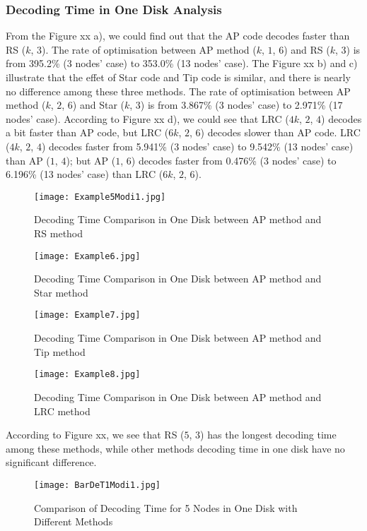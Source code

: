\subsubsection{Decoding Time in One Disk Analysis}
From the Figure xx a), we could find out that the AP code decodes faster than RS ($k$, $3$). The rate of optimisation between AP method ($k$, $1$, $6$) and RS ($k$, $3$) is from 395.2\% (3 nodes’ case) to 353.0\% (13 nodes’ case). The Figure xx b) and c) illustrate that the effet of Star code and Tip code is similar, and there is nearly no difference among these three methods. The rate of optimisation between AP method ($k$, $2$, $6$) and Star ($k$, $3$) is from 3.867\% (3 nodes’ case) to 2.971\% (17 nodes’ case). According to Figure xx d), we could see that LRC ($4k$, $2$, $4$) decodes a bit faster than AP code, but LRC ($6k$, $2$, $6$) decodes slower than AP code. LRC ($4k$, $2$, $4$) decodes faster from 5.941\% (3 nodes’ case) to 9.542\% (13 nodes’ case) than AP ($1$, $4$); but AP ($1$, $6$) decodes faster from 0.476\% (3 nodes’ case) to 6.196\% (13 nodes’ case) than LRC ($6k$, $2$, $6$).\par

\begin{figure}[H]
\begin{minipage}{0.25\lineWidth}
\centering
\texttt{[image: Example5Modi1.jpg]}
\caption{Decoding Time Comparison in One Disk between AP method and RS method}
\end{minipage}
\begin{minipage}{0.25\lineWidth}
\centering
\texttt{[image: Example6.jpg]}
\caption{Decoding Time Comparison in One Disk between AP method and Star method}
\end{minipage}
\begin{minipage}{0.25\lineWidth}
\centering
\texttt{[image: Example7.jpg]}
\caption{Decoding Time Comparison in One Disk between AP method and Tip method}
\end{minipage}
\begin{minipage}{0.25\lineWidth}
\centering
\texttt{[image: Example8.jpg]}
\caption{Decoding Time Comparison in One Disk between AP method and LRC method}
\end{minipage}
\end{figure}\par

According to Figure xx, we see that RS ($5$, $3$) has the longest decoding time among these methods, while other methods decoding time in one disk have no significant difference.\par
\begin{figure}[H]
\centering
\texttt{[image: BarDeT1Modi1.jpg]}
\caption{Comparison of Decoding Time for 5 Nodes in One Disk with Different Methods}
\end{figure}

